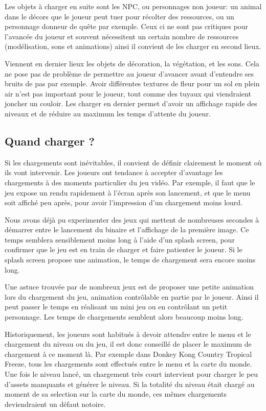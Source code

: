 \documentclass[a4paper, 11pt]{article} %
\begin{document}
Les objets à charger en suite sont les NPC, ou personnages non joueur: un animal dans le décors que le joueur peut tuer pour récolter des ressources, ou un personnage donneur de quête par exemple. Ceux ci ne sont pas critiques pour l'avancée du joueur et souvent nécessitent un certain nombre de ressources (modélisation, sons et animations) ainsi il convient de les charger en second lieux. 

Viennent en dernier lieux les objets de décoration, la végétation, et les sons. Cela ne pose pas de problème de permettre au joueur d'avancer avant d'entendre ses bruits de pas par exemple. Avoir différentes textures de fleur pour un sol en plein air n'est pas important pour le joueur, tout comme des tuyaux qui viendraient joncher un couloir. Les charger en dernier permet d'avoir un affichage rapide des niveaux et de réduire au maximum les temps d'attente du joueur.

\newpage
\subsection{Quand charger ?}
Si les chargements sont inévitables, il convient de définir clairement le moment où ils vont intervenir. Les joueurs ont tendance à accepter d'avantage les chargements à des moments particulier du jeu vidéo. Par exemple, il faut que le jeu expose un rendu rapidement à l'écran après son lancement, et que le menu soit affiché peu après, pour avoir l'impression d'un chargement moins lourd. 

Nous avons déjà pu experimenter des jeux qui mettent de nombreuses secondes à démarrer entre le lancement du binaire et l'affichage de la première image. Ce temps semblera sensiblement moins long à l'aide d'un splash screen, pour confirmer que le jeu est en train de charger et faire patienter le joueur. Si le splash screen propose une animation, le temps de chargement sera encore moins long.

Une astuce trouvée par de nombreux jeux est de proposer une petite animation lors du chargement du jeu, animation contrôlable en partie par le joueur. Ainsi il peut passer le temps en réalisant un mini jeu ou en contrôlant un petit personnage. Les temps de chargements semblent alors beaucoup moins long.

Historiquement, les joueurs sont habitués à devoir attendre entre le menu et le chargement du niveau ou du jeu, il est donc conseillé de placer le maximum de chargement à ce moment là. Par exemple dans Donkey Kong Country Tropical Freeze, tous les chargements sont effectués entre le menu et la carte du monde. Une fois le niveau lancé, un chargement très court intervient pour charger le peu d'assets manquants et générer le niveau. Si la totalité du niveau était chargé au moment de sa selection sur la carte du monde, ces mêmes chargements deviendraient un défaut notoire.
\end{document}
